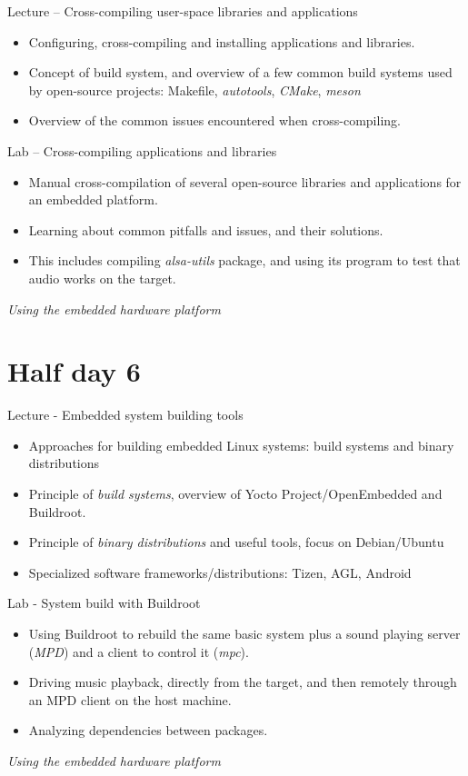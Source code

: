 \documentclass[a4paper,12pt,obeyspaces,spaces,hyphens]{article}
\begin{document}
\feagendatwocolumn
{Lecture – Cross-compiling user-space libraries and applications}
{
  \begin{itemize}
  \item Configuring, cross-compiling and installing applications and
    libraries.
  \item Concept of build system, and overview of a few common build
    systems used by open-source projects: Makefile, {\em autotools},
    {\em CMake}, {\em meson}
  \item Overview of the common issues encountered when
    cross-compiling.
  \end{itemize}
}
{Lab – Cross-compiling applications and libraries}
{
  \begin{itemize}
  \item Manual cross-compilation of several open-source libraries and
    applications for an embedded platform.
  \item Learning about common pitfalls and issues, and their
    solutions.
  \item This includes compiling {\em alsa-utils} package,
    and using its  program to test that
    audio works on the target.
  \end{itemize}

  \vspace{0.5cm}
  {\em Using the embedded hardware platform}
}

\section{Half day 6}

\feagendatwocolumn
{Lecture - Embedded system building tools}
{
  \begin{itemize}
  \item Approaches for building embedded Linux systems: build systems
    and binary distributions
  \item Principle of {\em build systems}, overview of Yocto
    Project/OpenEmbedded and Buildroot.
  \item Principle of {\em binary distributions} and useful tools,
    focus on Debian/Ubuntu
  \item Specialized software frameworks/distributions: Tizen, AGL,
    Android
  \end{itemize}
}
{Lab - System build with Buildroot}
{
  \begin{itemize}
  \item Using Buildroot to rebuild the same basic system
        plus a sound playing server ({\em MPD}) and a
        client to control it ({\em mpc}).
  \item Driving music playback, directly from the target,
        and then remotely through an MPD client on the
	host machine.
  \item Analyzing dependencies between packages.
  \end{itemize}

  \vspace{0.5cm}
  {\em Using the embedded hardware platform}
}
\end{document}
